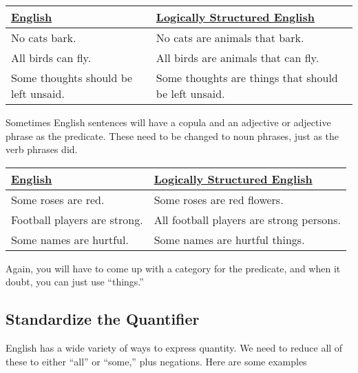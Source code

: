 \begin{longtabu}{p{.5\linewidth}p{.5\linewidth}}
\underline{English} &
\underline{Logically Structured English} \\
\endhead 
No cats bark. &
No cats are animals that bark.  \\ 

All birds can fly. &
All birds are animals that can fly.  \\

Some thoughts should be left unsaid. &
Some thoughts are things that should be left unsaid. 
\end{longtabu}

\noindent Sometimes English sentences will have a copula and an adjective or adjective phrase as the predicate. These need to be changed to noun phrases, just as the verb phrases did. 

\begin{longtabu}{p{.5\linewidth}p{.5\linewidth}}
\underline{English} &
\underline{Logically Structured English}  \\
\endhead 
Some roses are red. &
Some roses are red flowers. \\

Football players are strong. &
All football players are strong persons. \\

Some names are hurtful. &
Some names are hurtful things.
\end{longtabu}

\noindent Again, you will have to come up with a category for the predicate, and when it doubt, you can just use ``things.''

\subsection{Standardize the Quantifier}
\label{subsec:standardize_quantifier}

English has a wide variety of ways to express quantity. We need to reduce all of these to either ``all'' or ``some,'' plus negations.  Here are some examples

